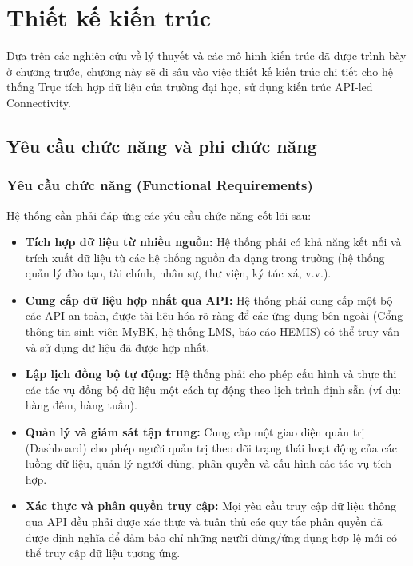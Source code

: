 \chapter{Thiết kế kiến trúc}

Dựa trên các nghiên cứu về lý thuyết và các mô hình kiến trúc đã được trình bày ở chương trước, chương này sẽ đi sâu vào việc thiết kế kiến trúc chi tiết cho hệ thống Trục tích hợp dữ liệu của trường đại học, sử dụng kiến trúc API-led Connectivity. 

\section{Yêu cầu chức năng và phi chức năng}
\subsection{Yêu cầu chức năng (Functional Requirements)}
Hệ thống cần phải đáp ứng các yêu cầu chức năng cốt lõi sau:
\begin{itemize}
    \item \textbf{Tích hợp dữ liệu từ nhiều nguồn:} Hệ thống phải có khả năng kết nối và trích xuất dữ liệu từ các hệ thống nguồn đa dạng trong trường (hệ thống quản lý đào tạo, tài chính, nhân sự, thư viện, ký túc xá, v.v.).
    \item \textbf{Cung cấp dữ liệu hợp nhất qua API:} Hệ thống phải cung cấp một bộ các API an toàn, được tài liệu hóa rõ ràng để các ứng dụng bên ngoài (Cổng thông tin sinh viên MyBK, hệ thống LMS, báo cáo HEMIS) có thể truy vấn và sử dụng dữ liệu đã được hợp nhất.
    \item \textbf{Lập lịch đồng bộ tự động:} Hệ thống phải cho phép cấu hình và thực thi các tác vụ đồng bộ dữ liệu một cách tự động theo lịch trình định sẵn (ví dụ: hàng đêm, hàng tuần).
    \item \textbf{Quản lý và giám sát tập trung:} Cung cấp một giao diện quản trị (Dashboard) cho phép người quản trị theo dõi trạng thái hoạt động của các luồng dữ liệu, quản lý người dùng, phân quyền và cấu hình các tác vụ tích hợp.
    \item \textbf{Xác thực và phân quyền truy cập:} Mọi yêu cầu truy cập dữ liệu thông qua API đều phải được xác thực và tuân thủ các quy tắc phân quyền đã được định nghĩa để đảm bảo chỉ những người dùng/ứng dụng hợp lệ mới có thể truy cập dữ liệu tương ứng.
\end{itemize}


